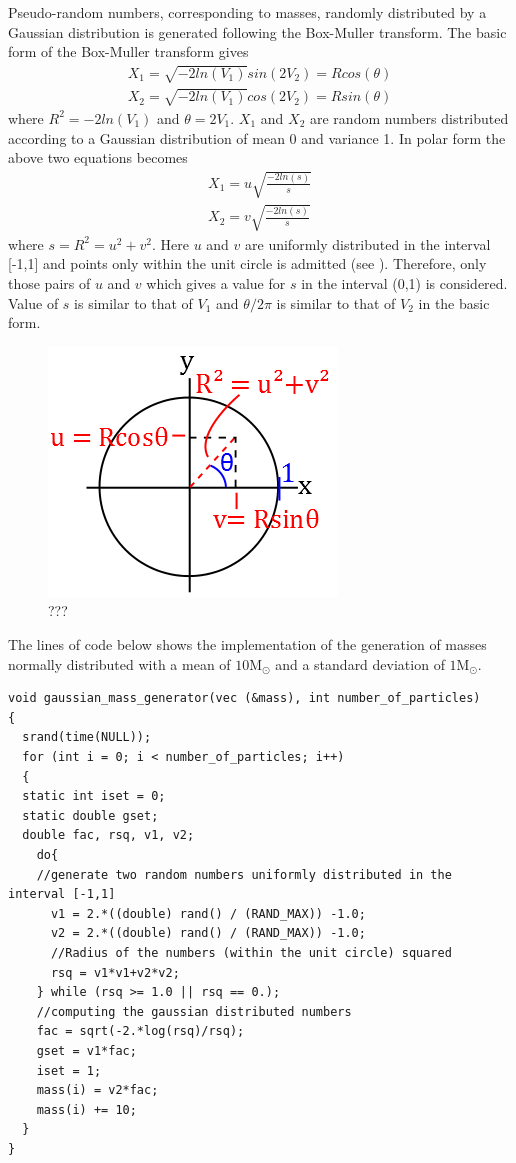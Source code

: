 Pseudo-random numbers, corresponding to masses, randomly distributed by a Gaussian distribution is generated following the Box-Muller transform. 
The basic form of the Box-Muller transform gives
\begin{align*}
	X_1 = \sqrt{-2ln(V_1)}sin(2V_2)=Rcos(\theta)
	\\
	X_2 = \sqrt{-2ln(V_1)}cos(2V_2)=Rsin(\theta)
\end{align*}
where $R ^2 = -2ln(V_1)$ and $\theta =2V_1$.
$X_1$ and $X_2$ are random numbers distributed according to a Gaussian distribution of mean 0 and variance 1.
In polar form the above two equations becomes
\begin{align*}
	X_1 = 
	u \sqrt{\frac{-2 ln(s)}{s}}
	\\
	X_2 = 
	v \sqrt{\frac{-2 ln(s)}{s}}
\end{align*}
where $s = R^2 = u^2 + v^2$. 
Here $u$ and $v$ are uniformly distributed in the interval [-1,1] and points only within the unit circle is admitted (see ). 
Therefore, only those pairs of $u$ and $v$ which gives a value for $s$ in the interval (0,1) is considered. 
Value of $s$ is similar to that of $V_1$ and $\theta/2\pi$ is similar to that of $V_2$ in the basic form.
\begin{figure}[H]
\centering
	\includegraphics[width=0.4\linewidth]{Figures/Gaussian_mass_generation_ill.png}
\caption{
???
}
\label{fig:Gaussian_mass_generation_ill}
\end{figure}
The lines of code below shows the implementation of the generation of masses normally distributed with a mean of $10\text{M}_{\odot}$ and a standard deviation of $1\text{M}_{\odot}$.
\begin{lstlisting}
void gaussian_mass_generator(vec (&mass), int number_of_particles)
{
  srand(time(NULL));
  for (int i = 0; i < number_of_particles; i++)
  {
  static int iset = 0;
  static double gset;
  double fac, rsq, v1, v2;
    do{
	//generate two random numbers uniformly distributed in the interval [-1,1]   
      v1 = 2.*((double) rand() / (RAND_MAX)) -1.0;
      v2 = 2.*((double) rand() / (RAND_MAX)) -1.0;
      //Radius of the numbers (within the unit circle) squared
      rsq = v1*v1+v2*v2;
    } while (rsq >= 1.0 || rsq == 0.);
    //computing the gaussian distributed numbers
    fac = sqrt(-2.*log(rsq)/rsq);
    gset = v1*fac;
    iset = 1;
    mass(i) = v2*fac;
    mass(i) += 10;
  }
}
\end{lstlisting}

